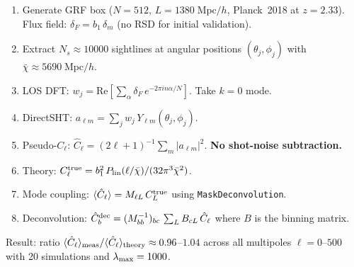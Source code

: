 \documentclass[11pt,a4paper]{article}
\newcommand{\chibar}{\bar{\chi}}
\newcommand{\Cl}{\hat{C}_\ell}
\begin{document}
\begin{enumerate}
  \item Generate GRF box ($N=512$, $L=1380\;\text{Mpc}/h$, Planck~2018 at
    $z=2.33$). Flux field: $\delta_F = b_1\,\delta_m$ (no RSD for
    initial validation).
  \item Extract $N_s \approx 10000$ sightlines at angular positions
    $(\theta_j,\phi_j)$ with $\chibar \approx 5690\;\text{Mpc}/h$.
  \item LOS DFT: $w_j = \text{Re}\left[\sum_\alpha \delta_F\,e^{-2\pi i n\alpha/N}\right]$.
    Take $k{=}0$ mode.
  \item DirectSHT: $a_{\ell m} = \sum_j w_j\,Y_{\ell m}(\theta_j,\phi_j)$.
  \item Pseudo-$C_\ell$: $\Cl = (2\ell+1)^{-1} \sum_m |a_{\ell m}|^2$.
    \textbf{No shot-noise subtraction.}
  \item Theory: $C_\ell^{\rm true} = b_1^2\,P_{\rm lin}(\ell/\chibar) / (32\pi^3\chibar^2)$.
  \item Mode coupling: $\langle\Cl\rangle = M_{\ell L}\,C_L^{\rm true}$
    using \texttt{MaskDeconvolution}.
  \item Deconvolution: $\hat{C}_b^{\rm dec} = (M_{bb}^{-1})_{bc}\,
    \sum_L B_{c L}\,\Cl$ where $B$ is the binning matrix.
\end{enumerate}

Result: ratio $\langle\Cl\rangle_{\rm meas} / \langle\Cl\rangle_{\rm theory}
\approx 0.96$--$1.04$ across all multipoles $\ell = 0$--$500$ with 20
simulations and $\lambda_{\rm max} = 1000$.
\end{document}
